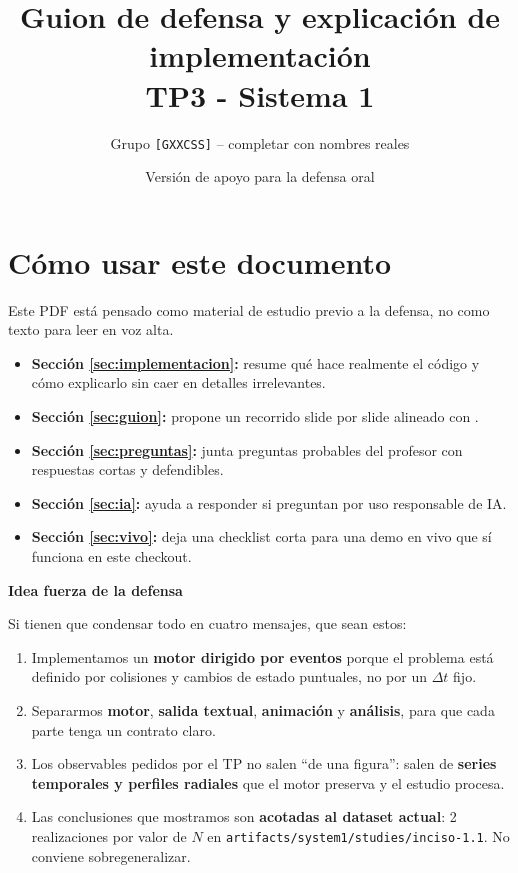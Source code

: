\documentclass[11pt]{article}
\title{\textbf{Guion de defensa y explicaci\'on de implementaci\'on}\\[0.3em]
\large TP3 - Sistema 1}
\author{Grupo \texttt{[GXXCSS]} -- completar con nombres reales}
\date{Versi\'on de apoyo para la defensa oral}
\newcommand{\sectionbox}[1]{
  \vspace{0.4em}
  {\colorbox{tplight}{\parbox{\dimexpr\linewidth-2\fboxsep\relax}{\textbf{\color{tpblue}#1}}}}
  \vspace{0.35em}
}
\begin{document}
\maketitle
\tableofcontents
\newpage

\section{C\'omo usar este documento}

Este PDF est\'a pensado como material de estudio previo a la defensa, no como texto para leer en voz alta.

\begin{itemize}
  \item \textbf{Secci\'on \ref{sec:implementacion}:} resume qu\'e hace realmente el c\'odigo y c\'omo explicarlo sin caer en detalles irrelevantes.
  \item \textbf{Secci\'on \ref{sec:guion}:} propone un recorrido slide por slide alineado con .
  \item \textbf{Secci\'on \ref{sec:preguntas}:} junta preguntas probables del profesor con respuestas cortas y defendibles.
  \item \textbf{Secci\'on \ref{sec:ia}:} ayuda a responder si preguntan por uso responsable de IA.
  \item \textbf{Secci\'on \ref{sec:vivo}:} deja una checklist corta para una demo en vivo que s\'i funciona en este checkout.
\end{itemize}

\sectionbox{Idea fuerza de la defensa}

Si tienen que condensar todo en cuatro mensajes, que sean estos:

\begin{enumerate}
  \item Implementamos un \textbf{motor dirigido por eventos} porque el problema est\'a definido por colisiones y cambios de estado puntuales, no por un $\Delta t$ fijo.
  \item Separarmos \textbf{motor}, \textbf{salida textual}, \textbf{animaci\'on} y \textbf{an\'alisis}, para que cada parte tenga un contrato claro.
  \item Los observables pedidos por el TP no salen ``de una figura'': salen de \textbf{series temporales y perfiles radiales} que el motor preserva y el estudio procesa.
  \item Las conclusiones que mostramos son \textbf{acotadas al dataset actual}: 2 realizaciones por valor de $N$ en \texttt{artifacts/system1/studies/inciso-1.1}. No conviene sobregeneralizar.
\end{enumerate}
\end{document}
